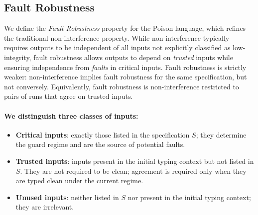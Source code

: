 \documentclass[12pt]{article}
\begin{document}
\subsection{Fault Robustness}
\label{sec:fr}

We define the \emph{Fault Robustness} property for the Poison language, which refines the traditional non-interference property. While non-interference typically requires outputs to be independent of all inputs not explicitly classified as low-integrity, fault robustness allows outputs to depend on \emph{trusted} inputs while ensuring independence from \emph{faults} in critical inputs. Fault robustness is strictly weaker: non-interference implies fault robustness for the same specification, but not conversely. Equivalently, fault robustness is non-interference restricted to pairs of runs that agree on trusted inputs.

\paragraph{We distinguish three classes of inputs:}
\begin{itemize}
  \item \textbf{Critical inputs}: exactly those listed in the specification $S$;
  they determine the guard regime and are the source of potential faults.
  \item \textbf{Trusted inputs}: inputs present in the initial typing context but not listed in $S$. They are not required to be clean; agreement is required only when they are typed clean under the current regime.
  \item \textbf{Unused inputs}: neither listed in $S$ nor present in the initial typing context; they are irrelevant.
\end{itemize}
\end{document}
